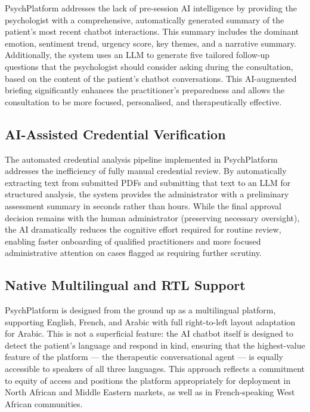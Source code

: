 PsychPlatform addresses the lack of pre-session AI intelligence by providing the
psychologist with a comprehensive, automatically generated summary of the
patient's most recent chatbot interactions. This summary includes the dominant
emotion, sentiment trend, urgency score, key themes, and a narrative summary.
Additionally, the system uses an LLM to generate five tailored follow-up
questions that the psychologist should consider asking during the consultation,
based on the content of the patient's chatbot conversations. This AI-augmented
briefing significantly enhances the practitioner's preparedness and allows the
consultation to be more focused, personalised, and therapeutically effective.

\subsection{AI-Assisted Credential Verification}

The automated credential analysis pipeline implemented in PsychPlatform addresses
the inefficiency of fully manual credential review. By automatically extracting
text from submitted PDFs and submitting that text to an LLM for structured
analysis, the system provides the administrator with a preliminary assessment
summary in seconds rather than hours. While the final approval decision remains
with the human administrator (preserving necessary oversight), the AI
dramatically reduces the cognitive effort required for routine review, enabling
faster onboarding of qualified practitioners and more focused administrative
attention on cases flagged as requiring further scrutiny.

\subsection{Native Multilingual and RTL Support}

PsychPlatform is designed from the ground up as a multilingual platform,
supporting English, French, and Arabic with full right-to-left layout adaptation
for Arabic. This is not a superficial feature: the AI chatbot itself is designed
to detect the patient's language and respond in kind, ensuring that the
highest-value feature of the platform — the therapeutic conversational agent —
is equally accessible to speakers of all three languages. This approach reflects
a commitment to equity of access and positions the platform appropriately for
deployment in North African and Middle Eastern markets, as well as in
French-speaking West African communities.

